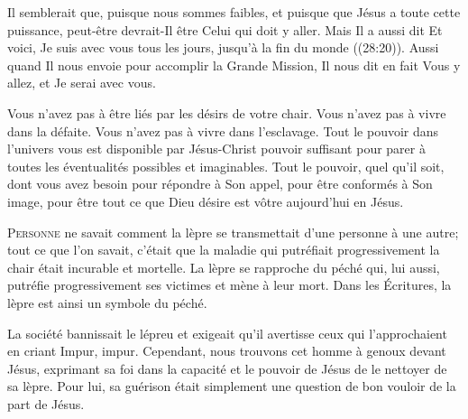Il semblerait que, puisque nous sommes faibles, et puisque que Jésus
 a toute cette puissance, peut-être devrait-Il être Celui qui doit y aller.
 Mais Il a aussi dit\frcolon{} 
 \Og Et voici, Je suis avec vous tous les jours,
 jusqu'à la fin du monde \Fg{} ((28:20)).
 Aussi quand Il nous envoie pour accomplir la Grande Mission,
 Il nous dit en fait\frcolon{} 
 \Og Vous y allez, et Je serai avec vous. \Fg{}



Vous n'avez pas à être liés par les désirs de votre chair.
 Vous n'avez pas à vivre dans la défaite. Vous n'avez pas à vivre
 dans l'esclavage. Tout le pouvoir dans l'univers vous est disponible
 par Jésus-Christ \ocadr pouvoir suffisant pour parer à toutes
 les éventualités possibles et imaginables.
 Tout le pouvoir, quel qu'il soit, dont vous avez besoin
 pour répondre à Son appel, pour être conformés à Son image,
 pour être tout ce que Dieu désire est vôtre aujourd'hui en Jésus. 

\dvrule






\lettrine{P}{ersonne} ne savait comment la lèpre se transmettait
 d'une personne à une autre; tout ce que l'on savait, c'était que la maladie
 \ocadr qui putréfiait progressivement la chair \fcadr{}
 était incurable et mortelle. La lèpre se rapproche du péché qui,
 lui aussi, putréfie progressivement ses victimes et mène à leur mort.
 Dans les Écritures, la lèpre est ainsi un symbole du péché. 

La société bannissait le lépreu et exigeait qu'il avertisse
 ceux qui l'approchaient en criant\frcolon{} 
 \Og Impur, impur. \Fg{}
 Cependant, nous trouvons cet homme à genoux devant Jésus,
 exprimant sa foi dans la capacité et le pouvoir de Jésus
 de le nettoyer de sa lèpre. Pour lui, sa guérison était simplement
 une question de bon vouloir de la part de Jésus. 

